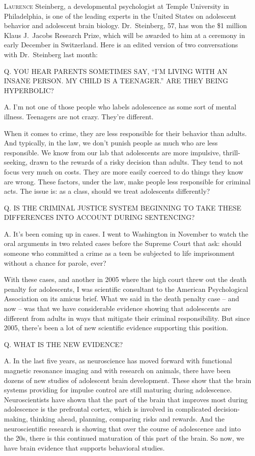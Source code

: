 ﻿\documentclass[12pt]{article}
\begin{document}
\lettrine{L}{aurence} Steinberg, a developmental psychologist at Temple
University in Philadelphia, is one of the leading experts in the United States on adolescent
behavior and adolescent brain biology. Dr.~Steinberg, 57, has won the \$1 million Klaus J.~Jacobs
Research Prize, which will be awarded to him at a ceremony in early December in Switzerland. Here is
an edited version of two conversations with Dr.~Steinberg last month:

Q. YOU HEAR PARENTS SOMETIMES SAY, ``I'M LIVING WITH AN INSANE PERSON. MY CHILD IS A TEENAGER.'' ARE
THEY BEING HYPERBOLIC?

A. I'm not one of those people who labels adolescence as some sort of mental illness. Teenagers are
not crazy. They're different.

When it comes to crime, they are less responsible for their behavior than adults. And typically, in
the law, we don't punish people as much who are less responsible. We know from our lab that
adolescents are more impulsive, thrill-seeking, drawn to the rewards of a risky decision than
adults. They tend to not focus very much on costs. They are more easily coerced to do things they
know are wrong. These factors, under the law, make people less responsible for criminal acts. The
issue is: as a class, should we treat adolescents differently?

Q. IS THE CRIMINAL JUSTICE SYSTEM BEGINNING TO TAKE THESE DIFFERENCES INTO ACCOUNT DURING
SENTENCING?

A. It's been coming up in cases. I went to Washington in November to watch the oral arguments in two
related cases before the Supreme Court that ask: should someone who committed a crime as a teen be
subjected to life imprisonment without a chance for parole, ever?

With these cases, and another in 2005 where the high court threw out the death penalty for
adolescents, I was scientific consultant to the American Psychological Association on its amicus
brief. What we said in the death penalty case -- and now -- was that we have considerable evidence
showing that adolescents are different from adults in ways that mitigate their criminal
responsibility. But since 2005, there's been a lot of new scientific evidence supporting this
position.

Q. WHAT IS THE NEW EVIDENCE?

A. In the last five years, as neuroscience has moved forward with functional magnetic resonance
imaging and with research on animals, there have been dozens of new studies of adolescent brain
development. These show that the brain systems providing for impulse control are still maturing
during adolescence. Neuroscientists have shown that the part of the brain that improves most during
adolescence is the prefrontal cortex, which is involved in complicated decision-making, thinking
ahead, planning, comparing risks and rewards. And the neuroscientific research is showing that over
the course of adolescence and into the 20s, there is this continued maturation of this part of the
brain. So now, we have brain evidence that supports behavioral studies.
\end{document}
